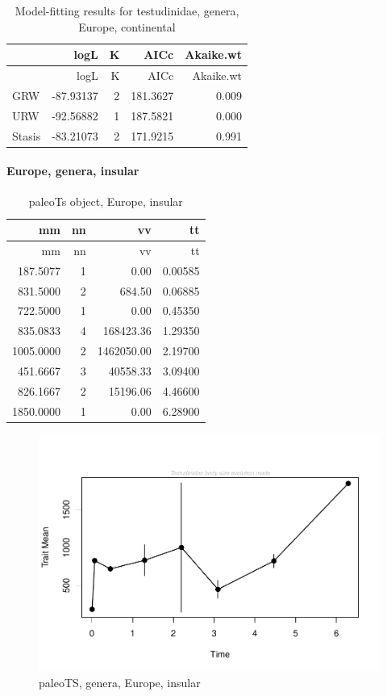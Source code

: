 \begin{longtable}[]{@{}lrrrr@{}}
	\caption{Model-fitting results for testudinidae, genera, Europe,
		continental}
	\label{tab:pTSEuCEM}\tabularnewline
	\toprule
	& logL & K & AICc & Akaike.wt\tabularnewline
	\midrule
	\endfirsthead
	\toprule
	& logL & K & AICc & Akaike.wt\tabularnewline
	\midrule
	\endhead
	GRW & -87.93137 & 2 & 181.3627 & 0.009\tabularnewline
	URW & -92.56882 & 1 & 187.5821 & 0.000\tabularnewline
	Stasis & -83.21073 & 2 & 171.9215 & 0.991\tabularnewline
	\bottomrule
\end{longtable}


\FloatBarrier
\paragraph{Europe, genera,
	insular}\label{europe-genera-insular}

\begin{longtable}[]{@{}rrrr@{}}
	\caption{paleoTs object, Europe, insular}
	\label{tab:pTSEuI}\tabularnewline
	\toprule
	mm & nn & vv & tt\tabularnewline
	\midrule
	\endfirsthead
	\toprule
	mm & nn & vv & tt\tabularnewline
	\midrule
	\endhead
	187.5077 & 1 & 0.00 & 0.00585\tabularnewline
	831.5000 & 2 & 684.50 & 0.06885\tabularnewline
	722.5000 & 1 & 0.00 & 0.45350\tabularnewline
	835.0833 & 4 & 168423.36 & 1.29350\tabularnewline
	1005.0000 & 2 & 1462050.00 & 2.19700\tabularnewline
	451.6667 & 3 & 40558.33 & 3.09400\tabularnewline
	826.1667 & 2 & 15196.06 & 4.46600\tabularnewline
	1850.0000 & 1 & 0.00 & 6.28900\tabularnewline
	\bottomrule
\end{longtable}

\begin{figure}[htbp]
	\centering
	\includegraphics{MA_JJ_files/figure-latex/pTSEuI-1.pdf}
	\caption{paleoTS, genera, Europe, insular}
	\label{fig:pTSEuI}
\end{figure}

